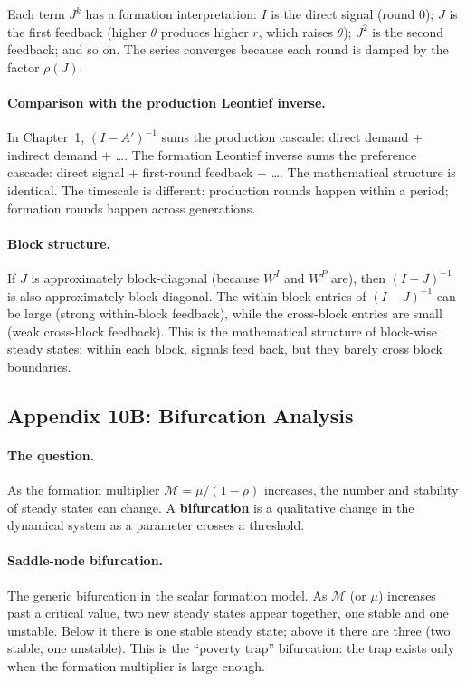 \documentclass[../structural_economics_book.tex]{subfiles}
\begin{document}
Each term $J^k$ has a formation interpretation: $I$ is the direct signal (round 0); $J$ is the first feedback (higher $\theta$ produces higher $r$, which raises $\theta$); $J^2$ is the second feedback; and so on. The series converges because each round is damped by the factor $\rho(J)$.

\paragraph{Comparison with the production Leontief inverse.} In Chapter~1, $(I - A')^{-1}$ sums the production cascade: direct demand $+$ indirect demand $+$ \ldots. The formation Leontief inverse sums the preference cascade: direct signal $+$ first-round feedback $+$ \ldots. The mathematical structure is identical. The timescale is different: production rounds happen within a period; formation rounds happen across generations.

\paragraph{Block structure.} If $J$ is approximately block-diagonal (because $W^I$ and $W^P$ are), then $(I - J)^{-1}$ is also approximately block-diagonal. The within-block entries of $(I - J)^{-1}$ can be large (strong within-block feedback), while the cross-block entries are small (weak cross-block feedback). This is the mathematical structure of block-wise steady states: within each block, signals feed back, but they barely cross block boundaries.


\subsection*{Appendix 10B: Bifurcation Analysis}
\label{ch10:app:bifurcation}

\paragraph{The question.} As the formation multiplier $\mathcal{M} = \mu/(1-\rho)$ increases, the number and stability of steady states can change. A \textbf{bifurcation} is a qualitative change in the dynamical system as a parameter crosses a threshold.

\paragraph{Saddle-node bifurcation.} The generic bifurcation in the scalar formation model. As $\mathcal{M}$ (or $\mu$) increases past a critical value, two new steady states appear together, one stable and one unstable. Below it there is one stable steady state; above it there are three (two stable, one unstable). This is the ``poverty trap'' bifurcation: the trap exists only when the formation multiplier is large enough.
\end{document}
